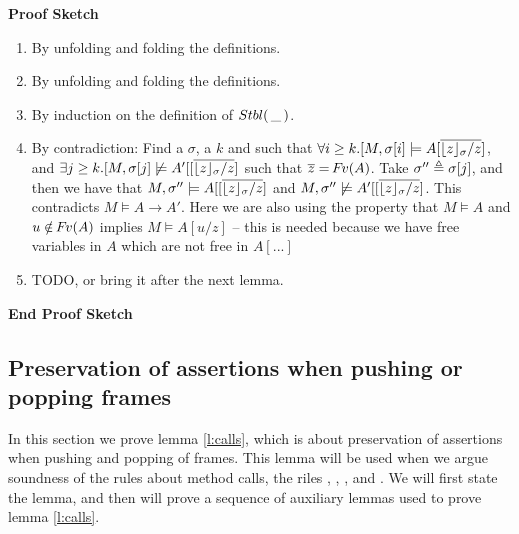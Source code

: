 {\noindent
\vspace{.1cm}
{\textbf{Proof Sketch}} 

\begin{enumerate}
\item
By unfolding and folding the definitions.
\item
By unfolding and folding the definitions.
\item
By induction on the definition of ${Stbl(\, \_\, )}$.
\item
By contradiction: Find a $\sigma$, a $k$ and   such that  
$\forall i\geq k.[M,{\sigma[i]} \models A[\overline{ {{\lfloor z \rfloor_{\sigma}}/ z}}]$, and
$\exists j\geq k.[M,{\sigma[j]} \not\models A'[[\overline{ {{\lfloor z \rfloor_{\sigma}}/ z}}]$
 such that $\overline z = {\hspace{-1pt}F\hspace{-1pt}}v(A)$.
 Take $\sigma''\triangleq  \sigma[j]$, and then we have that
 $M, \sigma'' \models A[[\overline{ {{\lfloor z \rfloor_{\sigma}}/ z}}]$ and  $M,  \sigma'' \not\models A'[[\overline{ {{\lfloor z \rfloor_{\sigma}}/ z}}]$.
 This contradicts $ M  \models A \rightarrow A'$.
 Here we are also using the property that $M \models A$  and $u\notin {\hspace{-1pt}F\hspace{-1pt}}v(A)$ implies $M \models A[u/z]$ -- this is needed because we have free variables in $A$ which are not free in $A[...]$ 
 {}
 {}
 \item
 TODO, or bring it after the next lemma.
\end{enumerate}
\noindent
{\textbf{End Proof Sketch}} 
\subsection{Preservation of assertions when pushing or popping frames}

In this section we  prove   lemma \ref{l:calls}, which is about preservation of assertions when pushing and popping of frames.
This lemma  will be used when we argue soundness of the rules about method calls, \ie the riles {}, {},
{}, and {}. We will first state the lemma, and then will prove a sequence of auxiliary lemmas used to prove lemma \ref{l:calls}.

}
